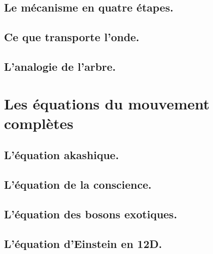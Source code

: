 \subsection{Le mécanisme en quatre étapes.}
\subsection{Ce que transporte l'onde.}
\subsection{L'analogie de l'arbre.}

\section{Les équations du mouvement complètes}
\subsection{L'équation akashique.}
\subsection{L'équation de la conscience.}
\subsection{L'équation des bosons exotiques.}
\subsection{L'équation d'Einstein en 12D.}

\newpage
